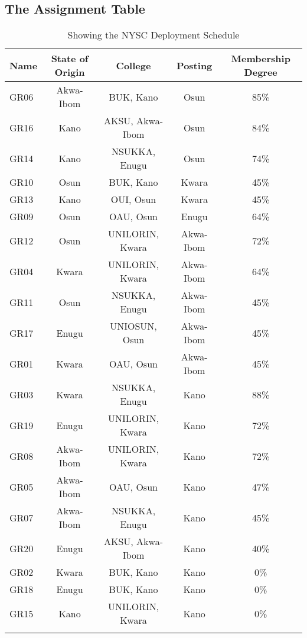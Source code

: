 \documentclass[a4paper,openany]{book}
\begin{document}
				\subsection{The Assignment Table}
						\begin{longtable}{|l|c|c|c|c|}
							\hline
							\textbf{Name} & \textbf{State of Origin} & \textbf{College} & \textbf{Posting} & \textbf{Membership Degree} \\
							\hline
							GR06 & Akwa-Ibom & BUK, Kano & Osun & 85\% \\
							\hline
							GR16 & Kano & AKSU, Akwa-Ibom & Osun & 84\% \\
							\hline
							GR14 & Kano & NSUKKA, Enugu & Osun & 74\% \\
							\hline
							GR10 & Osun & BUK, Kano & Kwara & 45\% \\
							\hline
							GR13 & Kano & OUI, Osun & Kwara & 45\% \\
							\hline
							GR09 & Osun & OAU, Osun & Enugu & 64\% \\
							\hline
							GR12 & Osun & UNILORIN, Kwara & Akwa-Ibom & 72\% \\
							\hline
							GR04 & Kwara & UNILORIN, Kwara & Akwa-Ibom & 64\% \\
							\hline
							GR11 & Osun & NSUKKA, Enugu & Akwa-Ibom & 45\% \\
							\hline
							GR17 & Enugu & UNIOSUN, Osun & Akwa-Ibom & 45\% \\
							\hline
							GR01 & Kwara & OAU, Osun & Akwa-Ibom & 45\% \\
							\hline
							GR03 & Kwara & NSUKKA, Enugu & Kano & 88\% \\
							\hline
							GR19 & Enugu & UNILORIN, Kwara & Kano & 72\% \\
							\hline
							GR08 & Akwa-Ibom & UNILORIN, Kwara & Kano & 72\% \\
							\hline
							GR05 & Akwa-Ibom & OAU, Osun & Kano & 47\% \\
							\hline
							GR07 & Akwa-Ibom & NSUKKA, Enugu & Kano & 45\% \\
							\hline
							GR20 & Enugu & AKSU, Akwa-Ibom & Kano & 40\% \\
							\hline
							GR02 & Kwara & BUK, Kano & Kano & 0\% \\
							\hline
							GR18 & Enugu & BUK, Kano & Kano & 0\% \\
							\hline
							GR15 & Kano & UNILORIN, Kwara & Kano & 0\% \\
							\hline
							\caption{Showing the NYSC Deployment Schedule\label{ex:table}}
						\end{longtable}								
\end{document}
